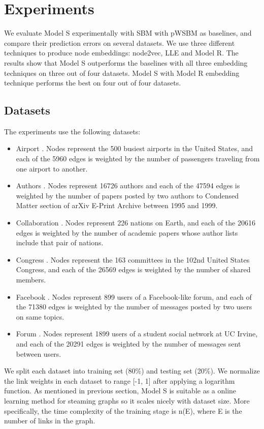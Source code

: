 \documentclass{article} %
\begin{document}
\section{Experiments} \label{section:experiments}
We evaluate Model S experimentally with SBM with pWSBM as baselines,
and compare their prediction errors on several datasets.
We use three different techniques to produce node embeddings: node2vec, LLE and Model R.
The results show that Model S outperforms the baselines with all three embedding techniques on three out of four datasets.
Model S with Model R embedding technique performs the best on four out of four datasets.

\subsection{Datasets}
The experiments use the following datasets:
\begin{itemize}
	\item Airport \citep{colizza2007reaction}. Nodes represent the 500 busiest airports in the United States, and each of the 5960 edges is weighted by the number of passengers traveling from one airport to another.
	\item Authors \citep{newman2001structure}. Nodes represent 16726 authors and each of the 47594 edges is weighted by the number of papers posted by two authors to Condensed Matter section of arXiv E-Print Archive between 1995 and 1999.
	\item Collaboration \citep{pan2012world}. Nodes represent 226 nations on Earth, and each of the 20616 edges is weighted by the number of academic papers whose author lists include that pair of nations.
	\item Congress \citep{porter2005network}. Nodes represent the 163 committees in the 102nd United States Congress, and each of the 26569 edges is weighted by the number of shared members.
	\item Facebook \citep{opsahl2013triadic}. Nodes represent 899 users of a Facebook-like forum, and each of the 71380 edges is weighted by the number of messages posted by two users on same topics.
	\item Forum \citep{opsahl2009clustering}. Nodes represent 1899 users of a student social network at UC Irvine, and each of the 20291 edges is weighted by the number of messages sent between users.
\end{itemize}
We split each dataset into training set (80\%) and testing set (20\%).
We normalize the link weights in each dataset to range [-1, 1] after applying a logarithm function.
As mentioned in previous section, Model S is suitable as a online learning method for steaming graphs so it scales nicely with dataset size.
More specifically, the time complexity of the training stage is n(E), where E is the number of links in the graph.
\end{document}
